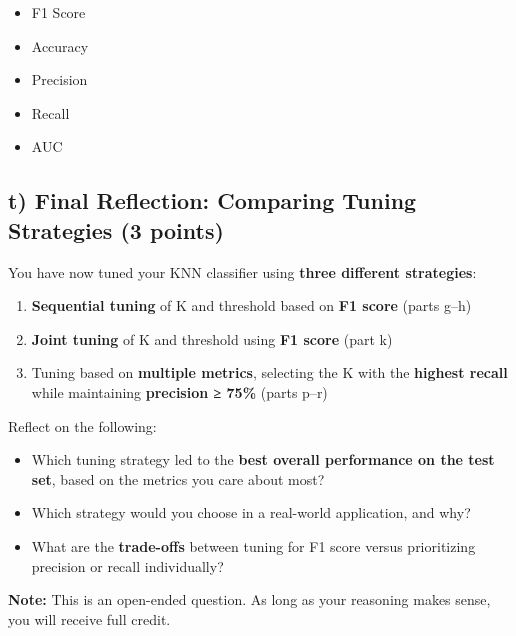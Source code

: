 \documentclass[
  letterpaper,
  DIV=11,
  numbers=noendperiod]{scrreprt}
\providecommand{\tightlist}{%
  \setlength{\itemsep}{0pt}\setlength{\parskip}{0pt}}\usepackage{longtable,booktabs,array}
\begin{document}
\begin{itemize}
\tightlist
\item
  F1 Score\\
\item
  Accuracy\\
\item
  Precision\\
\item
  Recall\\
\item
  AUC
\end{itemize}

\subsection{\texorpdfstring{t) Final Reflection: Comparing Tuning
Strategies \textbf{(3
points)}}{t) Final Reflection: Comparing Tuning Strategies (3 points)}}\label{t-final-reflection-comparing-tuning-strategies-3-points}

You have now tuned your KNN classifier using \textbf{three different
strategies}:

\begin{enumerate}
\def\labelenumi{\arabic{enumi}.}
\tightlist
\item
  \textbf{Sequential tuning} of K and threshold based on \textbf{F1
  score} (parts g--h)
\item
  \textbf{Joint tuning} of K and threshold using \textbf{F1 score} (part
  k)
\item
  Tuning based on \textbf{multiple metrics}, selecting the K with the
  \textbf{highest recall} while maintaining \textbf{precision ≥ 75\%}
  (parts p--r)
\end{enumerate}

Reflect on the following:

\begin{itemize}
\tightlist
\item
  Which tuning strategy led to the \textbf{best overall performance on
  the test set}, based on the metrics you care about most?
\item
  Which strategy would you choose in a real-world application, and why?
\item
  What are the \textbf{trade-offs} between tuning for F1 score versus
  prioritizing precision or recall individually?
\end{itemize}

\textbf{Note:} This is an open-ended question. As long as your reasoning
makes sense, you will receive full credit.
\end{document}
